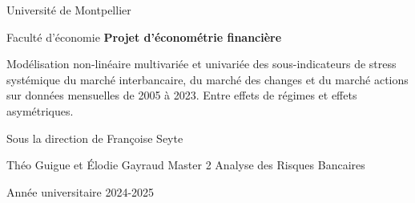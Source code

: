 \documentclass[12pt,a4paper]{article}
\begin{document}
\begin{titlepage}
    \noindent 
    \vfill
    \centering
    \textcolor{font}{\Large \textsf{Université de Montpellier}}\par\vspace{0.2cm}
    \textcolor{font}{\Large \textsf{Faculté d'économie}}
    \vfill
    \textcolor{font}{\fontsize{70}{48} \selectfont \bfseries Projet d'économétrie financière}\par\vspace{0.4cm}
    \textcolor{font}{\Large \textsf{Modélisation non-linéaire multivariée et univariée des sous-indicateurs de stress systémique du marché interbancaire, du marché des changes et du marché actions sur données mensuelles de 2005 à 2023. Entre effets de régimes et effets asymétriques.}}
    \vfill 
    \begin{center}
    \textcolor{font}{\Large \textsf{Sous la direction de Françoise Seyte}}  
    \end{center}
    \vfill
    \textcolor{font}{\Large \textsf{Théo Guigue et Élodie Gayraud}}
    \vfill
    \textcolor{font}{\textsf{Master 2 Analyse des Risques Bancaires}}\par\vspace{0.2cm}
    \textcolor{font}{\textsf{Année universitaire 2024-2025}}\par %
    \vspace{1cm} %
\end{titlepage}
\end{document}
